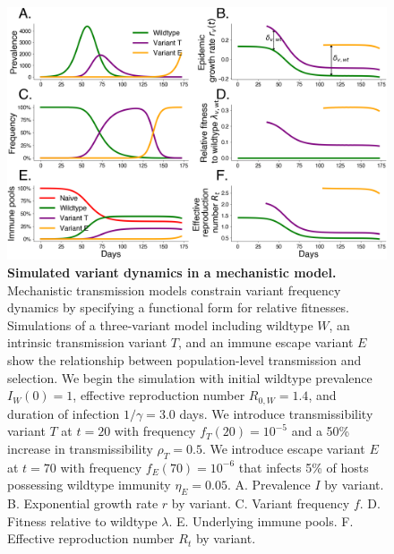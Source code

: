 \documentclass[11pt,oneside,letterpaper]{article}
\newcommand{\wt}{W}
\newcommand{\varEscape}{\eta}
\newcommand{\varTransmission}{\rho}
\def\tbc#1{\textcolor{purple}{[#1]}}
\begin{document}
\begin{figure}[h]
    \centering
    \includegraphics[width=1.0\linewidth]{./figures/vis_mechanisms.png}
    \caption{
      \textbf{Simulated variant dynamics in a mechanistic model.}
      Mechanistic transmission models constrain variant frequency dynamics by specifying a functional form for relative fitnesses.
      Simulations of a three-variant model including wildtype $W$, an intrinsic transmission variant $T$, and an immune escape variant $E$ show the relationship between population-level transmission and selection.
      We begin the simulation with initial wildtype prevalence $I_\wt(0) = 1$, effective reproduction number $R_{0,\wt} = 1.4$, and duration of infection $1/\gamma = 3.0$ days.
      We introduce transmissibility variant $T$ at $t=20$ with frequency $f_T(20) = 10^{-5}$ and a 50\% increase in transmissibility $\varTransmission_T = 0.5$.
      We introduce escape variant $E$ at $t=70$ with frequency $f_E(70) = 10^{-6}$ that infects 5\% of hosts possessing wildtype immunity $\varEscape_E = 0.05$.
      A. Prevalence $I$ by variant.
      B. Exponential growth rate $r$ by variant.
      C. Variant frequency $f$.
      D. Fitness relative to wildtype $\lambda$.
      E. Underlying immune pools.
      F. Effective reproduction number $R_t$ by variant.
    }
    \label{fig:vis_mechanisms}
\end{figure}

\end{document}
